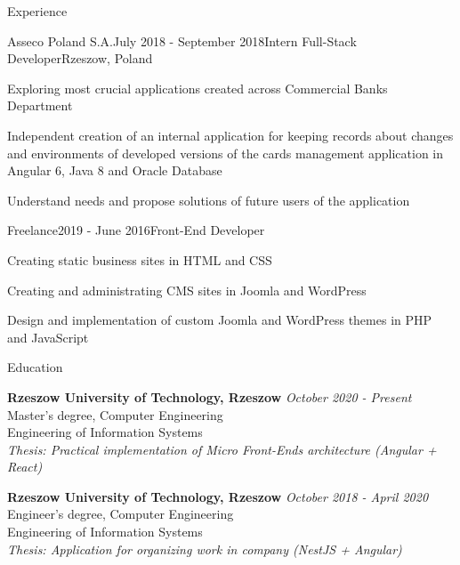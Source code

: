 \documentclass{resume} %
\begin{document}
\begin{rSection}{Experience}

\begin{rSubsection}{Asseco Poland S.A.}{July 2018 - September 2018}{Intern Full-Stack Developer}{Rzeszow, Poland}
\item Exploring most crucial applications created across Commercial Banks Department
\item Independent creation of an internal application for keeping records about changes and environments of developed versions of the cards management application in Angular 6, Java 8 and Oracle Database
\item Understand needs and propose solutions of future users of the application
\end{rSubsection}


\begin{rSubsection}{Freelance}{2019 - June 2016}{Front-End Developer}{}
\item Creating static business sites in HTML and CSS
\item Creating and administrating CMS sites in Joomla and WordPress
\item Design and implementation of custom Joomla and WordPress themes in PHP and JavaScript
\end{rSubsection}

\end{rSection}


\begin{rSection}{Education}

{\bf Rzeszow University of Technology, Rzeszow} \hfill {\em October 2020 - Present} \\ 
Master’s degree, Computer Engineering \\
Engineering of Information Systems \smallskip \\
\emph{Thesis: Practical implementation of Micro Front-Ends architecture (Angular + React)}

{\bf Rzeszow University of Technology, Rzeszow} \hfill {\em October 2018 - April 2020} \\ 
Engineer’s degree, Computer Engineering \\
Engineering of Information Systems \smallskip \\
\emph{Thesis: Application for organizing work in company (NestJS + Angular)}

\end{rSection}
\end{document}

